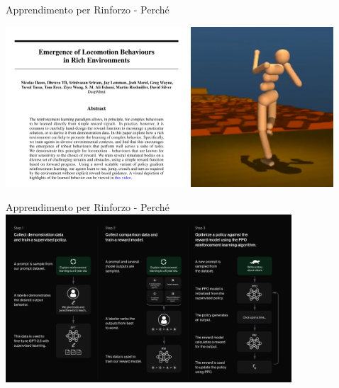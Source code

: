 \documentclass[presentation, 10pt,aspectratio=169]{beamer}\mode<presentation>{\usetheme{AMSBolognaFC}}
\begin{document}
\begin{frame}{Apprendimento per Rinforzo - Perché}
	\begin{center}
		\includegraphics[height=6cm]{img/emegence-of-motion.png}
		\includegraphics[height=6cm]{img/deep-mind-robot.png}
	\end{center} 
\end{frame}

\begin{frame}{Apprendimento per Rinforzo - Perché} 
	\centering
	\includegraphics[width=0.8\textwidth]{img/human-feedback.png}
\end{frame}
\end{document}
